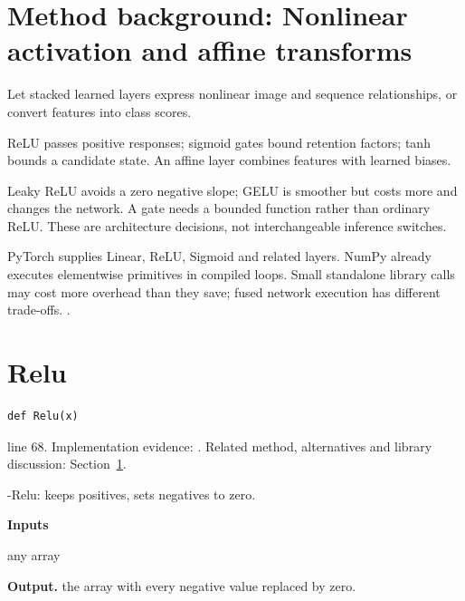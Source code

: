 \section{Method background: Nonlinear activation and affine transforms}\label{method:activation}
Let stacked learned layers express nonlinear image and sequence relationships, or convert features into class scores.


ReLU passes positive responses; sigmoid gates bound retention factors; tanh bounds a candidate state. An affine layer combines features with learned biases.


Leaky ReLU avoids a zero negative slope; GELU is smoother but costs more and changes the network. A gate needs a bounded function rather than ordinary ReLU. These are architecture decisions, not interchangeable inference switches.


PyTorch supplies Linear, ReLU, Sigmoid and related layers. NumPy already executes elementwise primitives in compiled loops. Small standalone library calls may cost more overhead than they save; fused network execution has different trade-offs. \cite{glorotrect,gravesbook,torchlinear}.


\section{Relu}\label{fn:recognise:Relu}
\begin{lstlisting}[style=sig]
def Relu(x)
\end{lstlisting}
 line 68. Implementation evidence: \cite{code2026}. Related method, alternatives and library discussion: Section~\ref{method:activation}.


-Relu: keeps positives, sets negatives to zero.




\noindent\textbf{Inputs}
\begin{description}[leftmargin=2.2em,style=nextline,font=\normalfont\ttfamily]\setlength\itemsep{1pt}
  \item[{x}] \normalfont any array
\end{description}

\noindent\textbf{Output.} the array with every negative value replaced by zero.


